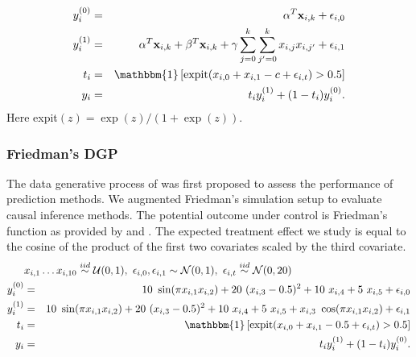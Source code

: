 \begin{eqnarray*}
y^{(0)}_i &=& \alpha^T\mathbf{x}_{i,k} + \epsilon_{i,0}\\
y^{(1)}_i &=& \alpha^T\mathbf{x}_{i,k} + \beta^T\mathbf{x}_{i,k} + \gamma \sum_{j=0}^k \sum_{j'=0}^k x_{i,j}x_{i,j'} + \epsilon_{i,1}\\
t_i &=& \mathbbm{1}\left[\text{expit}(x_{i,0} + x_{i,1} - c +  \epsilon_{i,t})  > 0.5 \right] \\
y_i &=& t_i y^{(1)}_i + (1-t_i) y^{(0)}_i.
\end{eqnarray*}
Here expit$(z) = \exp(z)/(1+\exp(z))$.

\subsubsection{Friedman's DGP} \label{dgp2}
The data generative process of \cite{friedman1991multivariate} was first proposed to assess the performance of prediction methods. We augmented Friedman's simulation setup to evaluate causal inference methods. The potential outcome under control is Friedman's function as provided by \citet{friedman1991multivariate} and \citet{Chipman10bart:bayesian}. The expected treatment effect we study is equal to the cosine of the product of the first two covariates scaled by the third covariate. 
\begin{eqnarray*}
\lefteqn{ x_{i,1} \dots x_{i,10} \overset{iid}{\sim} \mathcal{U}(0,1), \
    \epsilon_{i,0},\epsilon_{i,1} \sim \mathcal{N}(0,1), \ 
    \epsilon_{i,t}\overset{iid}{\sim} \mathcal{N}(0,20)}\\
    y^{(0)}_i &=& 10~\sin(\pi x_{i,1} x_{i,2}) + 20~(x_{i,3} - 0.5)^2 + 10~x_{i,4} + 5~x_{i,5} + \epsilon_{i,0}\\
     y^{(1)}_i &=& 10~\sin(\pi x_{i,1} x_{i,2}) + 20~(x_{i,3} - 0.5)^2 + 10~x_{i,4} + 5~x_{i,5} + x_{i,3}~\cos(\pi x_{i,1} x_{i,2}) + \epsilon_{i,1}\\
     t_i &=& \mathbbm{1}\left[\text{expit}(x_{i,0} + x_{i,1} - 0.5 +  \epsilon_{i,t})  > 0.5 \right] \\
    y_i &=& t_i y^{(1)}_i + (1-t_i) y^{(0)}_i.
\end{eqnarray*}
